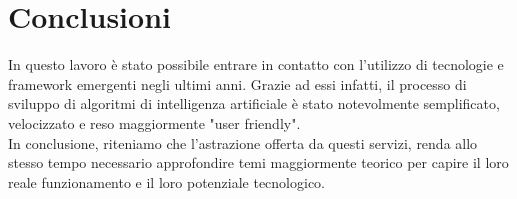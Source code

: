 \section{Conclusioni}
In questo lavoro è stato possibile entrare in contatto con l'utilizzo di tecnologie e framework emergenti negli ultimi anni.
Grazie ad essi infatti, il processo di sviluppo di algoritmi di intelligenza artificiale è stato notevolmente semplificato, velocizzato e reso maggiormente "user friendly".
\\ In conclusione, riteniamo che l'astrazione offerta da questi servizi, renda allo stesso tempo necessario approfondire temi maggiormente teorico per capire il loro reale funzionamento e il loro potenziale tecnologico.
